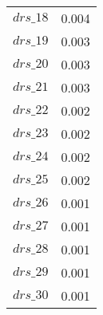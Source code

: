 \begin{center}
\begin{longtable}{cc}
$drs\_18$ 	 & 	 0.004 \\
$drs\_19$ 	 & 	 0.003 \\
$drs\_20$ 	 & 	 0.003 \\
$drs\_21$ 	 & 	 0.003 \\
$drs\_22$ 	 & 	 0.002 \\
$drs\_23$ 	 & 	 0.002 \\
$drs\_24$ 	 & 	 0.002 \\
$drs\_25$ 	 & 	 0.002 \\
$drs\_26$ 	 & 	 0.001 \\
$drs\_27$ 	 & 	 0.001 \\
$drs\_28$ 	 & 	 0.001 \\
$drs\_29$ 	 & 	 0.001 \\
$drs\_30$ 	 & 	 0.001 \\
\bottomrule%
\end{longtable}
\end{center}
